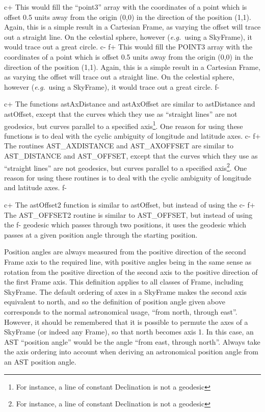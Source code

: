 \documentclass[twoside,11pt]{starlink}
\begin{document}
c+
This would fill the ``point3'' array with the coordinates of a point
which is offset 0.5 units away from the origin (0,0) in the direction
of the position (1,1). Again, this is a simple result in a Cartesian
Frame, as varying the offset will trace out a straight line. On the
celestial sphere, however (\emph{e.g.}\ using a SkyFrame), it would
trace out a great circle.
c-
f+
This would fill the POINT3 array with the coordinates of a point which
is offset 0.5 units away from the origin (0,0) in the direction of the
position (1,1). Again, this is a simple result in a Cartesian Frame,
as varying the offset will trace out a straight line. On the celestial
sphere, however (\emph{e.g.}\ using a SkyFrame), it would trace out a
great circle.
f-

c+
The functions astAxDistance and astAxOffset are similar to astDistance
and astOffset, except that the curves which they use as ``straight
lines'' are not geodesics, but curves parallel to a specified axis\footnote
{For instance, a line of constant Declination is not a geodesic}. One
reason for using these functions is to deal with the cyclic ambiguity of
longitude and latitude axes.
c-
f+
The routines AST\_AXDISTANCE and AST\_AXOFFSET are similar to AST\_DISTANCE
and AST\_OFFSET, except that the curves which they use as ``straight
lines'' are not geodesics, but curves parallel to a specified axis\footnote
{For instance, a line of constant Declination is not a geodesic}. One
reason for using these routines is to deal with the cyclic ambiguity of
longitude and latitude axes.
f-

c+
The astOffset2 function is similar to astOffset, but instead of using the
c-
f+
The AST\_OFFSET2 routine is similar to AST\_OFFSET, but instead of using the
f-
geodesic which passes through two positions, it uses the geodesic which
passes at a given position angle through the starting position.

Position angles are always measured from the positive direction of the
second Frame axis to the required line, with positive angles being in the
same sense as rotation from the positive direction of the second axis to
the positive direction of the first Frame axis. This definition applies
to all classes of Frame, including SkyFrame. The default ordering of axes
in a SkyFrame makes the second axis equivalent to north, and so the
definition of position angle given above corresponds to the normal
astronomical usage, ``from north, through east''. However, it should be
remembered that it is possible to permute the axes of a SkyFrame (or
indeed any Frame), so that north becomes axis 1. In this case, an AST
``position angle'' would be the angle ``from east, through north''.
Always take the axis ordering into account when deriving an astronomical
position angle from an AST position angle.
\end{document}
